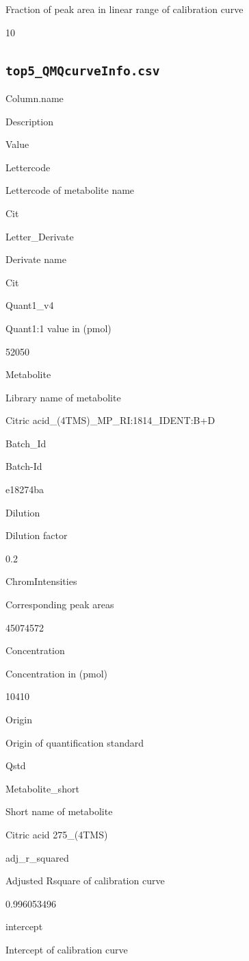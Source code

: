 \documentclass[]{book}
\theoremstyle{definition}
\theoremstyle{definition}
\theoremstyle{definition}
\theoremstyle{remark}
\begin{document}
Fraction of peak area in linear range of calibration curve

10

\subsection{\texorpdfstring{\texttt{top5\_QMQcurveInfo.csv}}{top5\_QMQcurveInfo.csv}}\label{top5_qmqcurveinfo.csv}

Column.name

Description

Value

Lettercode

Lettercode of metabolite name

Cit

Letter\_Derivate

Derivate name

Cit

Quant1\_v4

Quant1:1 value in (pmol)

52050

Metabolite

Library name of metabolite

Citric acid\_(4TMS)\_MP\_RI:1814\_IDENT:B+D

Batch\_Id

Batch-Id

e18274ba

Dilution

Dilution factor

0.2

ChromIntensities

Corresponding peak areas

45074572

Concentration

Concentration in (pmol)

10410

Origin

Origin of quantification standard

Qstd

Metabolite\_short

Short name of metabolite

Citric acid 275\_(4TMS)

adj\_r\_squared

Adjusted Rsquare of calibration curve

0.996053496

intercept

Intercept of calibration curve
\end{document}
